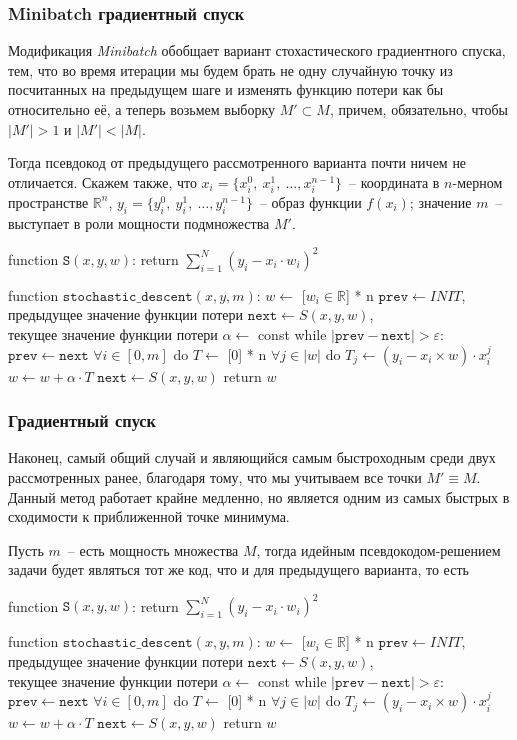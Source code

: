\documentclass[12pt, a4paper, oneside, final]{article}
\begin{document}
	\subsubsection*{Minibatch градиентный спуск}
	Модификация \textit{Minibatch} обобщает вариант стохастического градиентного спуска, тем, что во время итерации мы будем брать не одну случайную точку из посчитанных на предыдущем шаге и изменять функцию потери как бы относительно её, а теперь возьмем выборку $M' \subset M$, причем, обязательно, чтобы $|M'| > 1$ и $|M'| < |M|$.

	Тогда псевдокод от предыдущего рассмотренного варианта почти ничем не отличается.
	Скажем также, что $x_{i} = \{x^{0}_{i}, ~ x^{1}_{i}, ~ \ldots, x^{n - 1}_{i}\}$~-- координата в $n$-мерном пространстве $\mathbb{R}^{n}$, $y_{i} = \{y^{0}_{i}, ~ y^{1}_{i}, ~ \ldots, y^{n - 1}_{i}\}$~-- образ функции $f(x_{i})$; значение $m$~-- выступает в роли мощности подмножества $M'$.
	\begin{mylisting}
function $\mathtt{S}(x, y, w)$:
	return $\sum\limits_{i = 1}^{N}{(y_{i} - x_{i} \cdot w_{i})^{2}}$
	
function $\mathtt{stochastic\_descent}(x, y, m)$:
	$w \gets$ [$w_{i} \in \mathbb{R}$] * n
	$\mathtt{prev} \gets INIT$, $\text{предыдущее значение функции потери}$
	$\mathtt{next} \gets S(x, y, w)$, $\text{текущее значение функции потери}$
	$\alpha \gets$ const
	while $|\mathtt{prev} - \mathtt{next}| > \varepsilon$:
		$\mathtt{prev} \gets \mathtt{next}$
		$\forall i \in [0, m]$ do
			$T \gets$ [0] * n
			$\forall j \in |w|$ do
				$T_{j} \gets (y_{i} - x_{i} \times w) \cdot x_{i}^{j}$
			$w \gets w + \alpha \cdot T$
		$\mathtt{next} \gets S(x, y, w)$
	return $w$
	\end{mylisting}
	\subsubsection*{Градиентный спуск}
	Наконец, самый общий случай и являющийся самым быстроходным среди двух рассмотренных ранее, благодаря тому, что мы учитываем все точки $M' \equiv M$.
	Данный метод работает крайне медленно, но является одним из самых быстрых в сходимости к приближенной точке минимума.

	Пусть $m$~-- есть мощность множества $M$, тогда идейным псевдокодом-решением задачи будет являться тот же код, что и для предыдущего варианта, то есть
	\begin{mylisting}
function $\mathtt{S}(x, y, w)$:
	return $\sum\limits_{i = 1}^{N}{(y_{i} - x_{i} \cdot w_{i})^{2}}$
	
function $\mathtt{stochastic\_descent}(x, y, m)$:
	$w \gets$ [$w_{i} \in \mathbb{R}$] * n
	$\mathtt{prev} \gets INIT$, $\text{предыдущее значение функции потери}$
	$\mathtt{next} \gets S(x, y, w)$, $\text{текущее значение функции потери}$
	$\alpha \gets$ const
	while $|\mathtt{prev} - \mathtt{next}| > \varepsilon$:
		$\mathtt{prev} \gets \mathtt{next}$
		$\forall i \in [0, m]$ do
			$T \gets$ [0] * n
			$\forall j \in |w|$ do
				$T_{j} \gets (y_{i} - x_{i} \times w) \cdot x_{i}^{j}$
		$w \gets w + \alpha \cdot T$
	$\mathtt{next} \gets S(x, y, w)$
	return $w$
	\end{mylisting}
\end{document}
